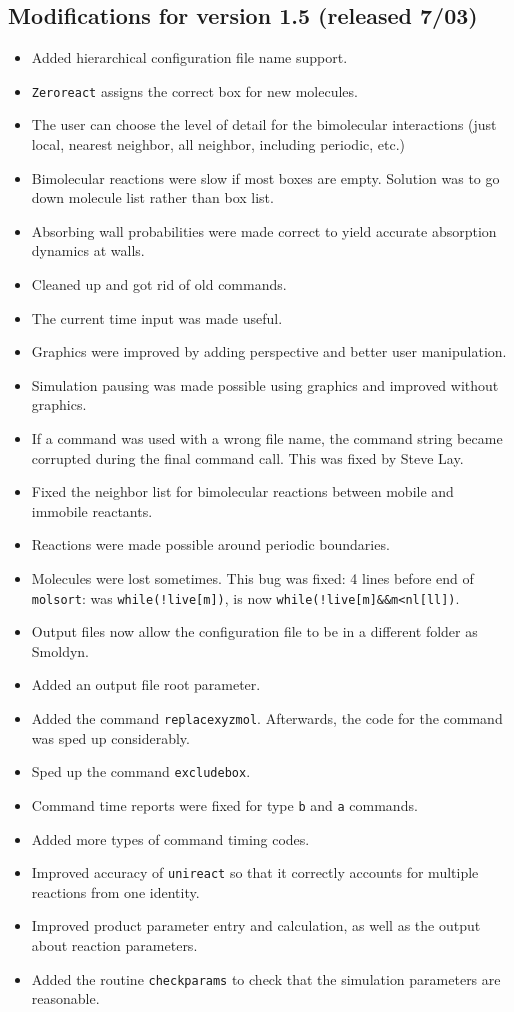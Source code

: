 \documentclass {book}
\begin{document}
\subsection*{Modifications for version 1.5 (released 7/03)}
\begin{itemize}
\item Added hierarchical configuration file name support.
\item \texttt{Zeroreact} assigns the correct box for new molecules.
\item The user can choose the level of detail for the bimolecular interactions (just local, nearest neighbor, all neighbor, including periodic, etc.)
\item Bimolecular reactions were slow if most boxes are empty.  Solution was to go down molecule list rather than box list.
\item Absorbing wall probabilities were made correct to yield accurate absorption dynamics at walls.
\item Cleaned up and got rid of old commands.
\item The current time input was made useful.
\item Graphics were improved by adding perspective and better user manipulation.
\item Simulation pausing was made possible using graphics and improved without graphics.
\item If a command was used with a wrong file name, the command string became corrupted during the final command call.  This was fixed by Steve Lay.
\item Fixed the neighbor list for bimolecular reactions between mobile and immobile reactants.
\item Reactions were made possible around periodic boundaries.
\item Molecules were lost sometimes.  This bug was fixed: 4 lines before end of \texttt{molsort}: was \lstinline{while(!live[m])}, is now \lstinline{while(!live[m]&&m<nl[ll])}.
\item Output files now allow the configuration file to be in a different folder as Smoldyn.
\item Added an output file root parameter.
\item Added the command \texttt{replacexyzmol}.  Afterwards, the code for the command was sped up considerably.
\item Sped up the command \texttt{excludebox}.
\item Command time reports were fixed for type \texttt{b} and \texttt{a} commands.
\item Added more types of command timing codes.
\item Improved accuracy of \texttt{unireact} so that it correctly accounts for multiple reactions from one identity.
\item Improved product parameter entry and calculation, as well as the output about reaction parameters.
\item Added the routine \texttt{checkparams} to check that the simulation parameters are reasonable.
\end{itemize}
\end{document}
